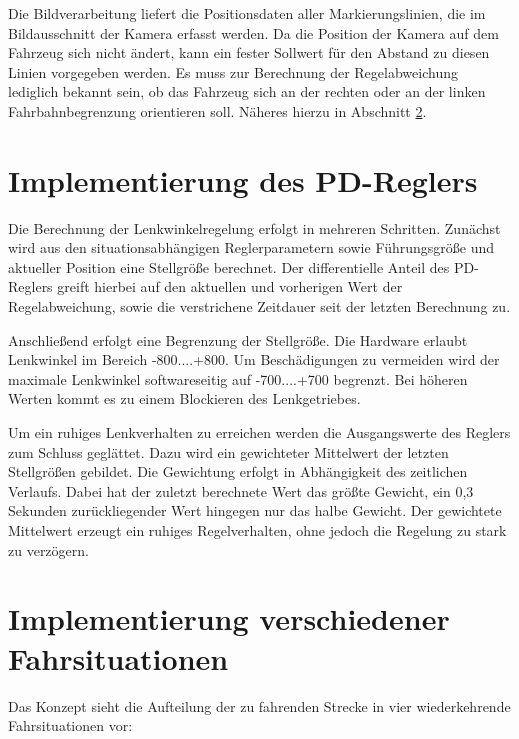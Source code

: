Die Bildverarbeitung liefert die Positionsdaten aller Markierungslinien, die im Bildausschnitt der Kamera erfasst werden. Da die Position der Kamera auf dem Fahrzeug sich nicht ändert, kann ein fester Sollwert für den Abstand zu diesen Linien vorgegeben werden. Es muss zur Berechnung der Regelabweichung lediglich bekannt sein, ob das Fahrzeug sich an der rechten oder an der linken Fahrbahnbegrenzung orientieren soll. Näheres hierzu in Abschnitt \ref{sec:fahrsituationen}.


\section{Implementierung des PD-Reglers}
\label{sec:pdregler}

Die Berechnung der Lenkwinkelregelung erfolgt in mehreren Schritten. Zunächst wird aus den situationsabhängigen Reglerparametern sowie Führungsgröße und aktueller Position eine Stellgröße berechnet. Der differentielle Anteil des PD-Reglers greift hierbei auf den aktuellen und vorherigen Wert der Regelabweichung, sowie die verstrichene Zeitdauer seit der letzten Berechnung zu.


Anschließend erfolgt eine Begrenzung der Stellgröße. Die Hardware erlaubt Lenkwinkel im Bereich -800....+800. Um Beschädigungen zu vermeiden wird der maximale Lenkwinkel softwareseitig auf -700....+700 begrenzt. Bei höheren Werten kommt es zu einem Blockieren des Lenkgetriebes.

Um ein ruhiges Lenkverhalten zu erreichen werden die Ausgangswerte des Reglers zum Schluss geglättet. Dazu wird ein gewichteter Mittelwert der letzten Stellgrößen gebildet. Die Gewichtung erfolgt in Abhängigkeit des zeitlichen Verlaufs. Dabei hat der zuletzt berechnete Wert das größte Gewicht, ein 0,3 Sekunden zurückliegender Wert hingegen nur das halbe Gewicht. Der gewichtete Mittelwert erzeugt ein ruhiges Regelverhalten, ohne jedoch die Regelung zu stark zu verzögern.


\section{Implementierung verschiedener Fahrsituationen}
\label{sec:fahrsituationen}

Das Konzept sieht die Aufteilung der zu fahrenden Strecke in vier wiederkehrende Fahrsituationen vor:

